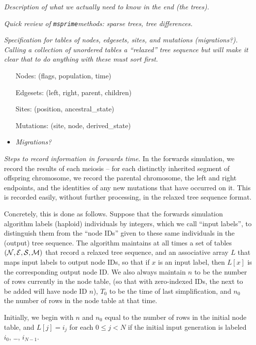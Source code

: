 \documentclass{article}
\newcommand{\msprime}{\texttt{msprime}}
\newcommand{\plr}[1]{{\em \color{blue} #1}}
\begin{document}
\plr{Description of what we actually need to know in the end (the trees).}

\plr{Quick review of \msprime methods: sparse trees, tree differences.}

\plr{Specification for tables of nodes, edgesets, sites, and mutations (migrations?).}
\plr{Calling a collection of unordered tables a ``relaxed'' tree sequence
    but will make it clear that to do anything with these must sort first.}

\begin{itemize}
    \item[Nodes:]
        (flags, population, time)
    \item[Edgesets:]
        (left,  right,  parent,  children)
    \item[Sites:]
        (position,  ancestral\_state)
    \item[Mutations:]
        (site,  node,  derived\_state)
    \item \plr{Migrations?}
\end{itemize}


\plr{Steps to record information in forwards time.}
In the forwards simulation,
we record the results of each meiosis --
for each distinctly inherited segment of offspring chromosome,
we record the parental chromosome,
the left and right endpoints,
and the identities of any new mutations that have occurred on it.
This is recorded easily, without further processing,
in the relaxed tree sequence format.

Concretely, this is done as follows.
Suppose that the forwards simulation algorithm labels (haploid) individuals by integers,
which we call ``input labels'', 
to distinguish them from the ``node IDs'' given to these same individuals in the (output) tree sequence.
The algorithm maintains at all times a set of tables $(\mathcal{N}, \mathcal{E}, \mathcal{S}, \mathcal{M})$
that record a relaxed tree sequence,
and an associative array $L$ that maps input labels to output node IDs, so that if $x$ is an input label,
then $L[x]$ is the corresponding output node ID.
We also always maintain $n$ to be the number of rows currently in the node table,
(so that with zero-indexed IDs, the next to be added will have node ID $n$),
$T_0$ to be the time of last simplification,
and $n_0$ the number of rows in the node table at that time. 

Initially, we begin with $n$ and $n_0$ equal to the number of rows in the initial node table,
and $L[j] = i_j$ for each $0 \le j < N$ if the initial input generation is labeled
$i_0$, \ldots, $i_{N-1}$.
\end{document}
